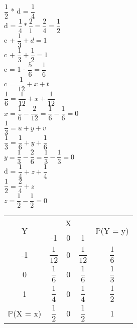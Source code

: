 \documentclass[12pt,a4paper]{article}
\begin{document}
\begin{center}
	\vspace{0.25cm}\\
	$\dfrac{1}{2}$ * d = $\dfrac{1}{4}$
	\vspace{0.25cm}\\
	d = $\dfrac{1}{4} * \dfrac{2}{1} = \dfrac{2}{4} = \dfrac{1}{2}$
	\vspace{1cm}\\
	c + $\dfrac{1}{3} + d = 1$
	\vspace{0.25cm}\\
	c + $\dfrac{1}{3} + \dfrac{1}{2} = 1$
	\vspace{0.25cm}\\
	c = 1 - $\dfrac{5}{6} = \dfrac{1}{6}$
	\vspace{1cm}\\
	c = $\dfrac{1}{12} + x + t$
	\vspace{0.25cm}\\
	$\dfrac{1}{6} = \dfrac{1}{12} + x + \dfrac{1}{12}$
	\vspace{0.25cm}\\
	$x= \dfrac{1}{6} - \dfrac{2}{12} = \dfrac{1}{6} - \dfrac{1}{6} = 0$
	\vspace{1cm}\\
	$\dfrac{1}{3} = u + y + v$
	\vspace{0.25cm}\\
	$\dfrac{1}{3} = \dfrac{1}{6} + y + \dfrac{1}{6}$
	\vspace{0.25cm}\\
	$y= \dfrac{1}{3} - \dfrac{2}{6} = \dfrac{1}{3} - \dfrac{1}{3} = 0$
	\vspace{1cm}\\
	d = $\dfrac{1}{4} + z + \dfrac{1}{4}$
	\vspace{0.25cm}\\
	$\dfrac{1}{2} = \dfrac{2}{4} + z$
	\vspace{0.25cm}\\
	$z = \dfrac{1}{2} - \dfrac{1}{2} = 0$
	\vspace{1cm}\\
	\begin{tabular}{|c|c|c|c|c|} \hline
		\multirow{2}{*}{Y} & \multicolumn{3}{c|}{X} & \multirow{2}{*}{$\mathbb{P}$(Y = y)}\\ \cline{2-4}
		& -1 & 0 & 1 & \\ \hline
		-1 & $\dfrac{1}{12}$ & 0 & $\dfrac{1}{12}$ & $\dfrac{1}{6}$\\ \hline
		0 & $\dfrac{1}{6}$ & 0 & $\dfrac{1}{6}$ & $\dfrac{1}{3}$\\ \hline
		1 & $\dfrac{1}{4}$ & 0 & $\dfrac{1}{4}$ & $\dfrac{1}{2}$\\ \hline
		$\mathbb{P}$(X = x) & $\dfrac{1}{2}$ & 0 & $\dfrac{1}{2}$ & 1\\ \hline
	\end{tabular}
\end{center}
\end{document}
